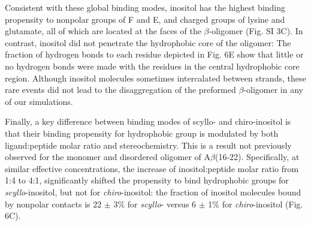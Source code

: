 Consistent with these global binding modes, inositol has the highest binding propensity to nonpolar groups of F and E, and charged groups of lysine and glutamate, all of which are located at the faces of the $\beta$-oligomer (Fig. SI 3C).  In contrast, inositol did not penetrate the hydrophobic core of the oligomer: The fraction of hydrogen bonds to each residue depicted in Fig. 6E show that little or no hydrogen bonds were made with the residues in the central hydrophobic core region. Although inositol molecules sometimes intercalated between strands, these rare events did not lead to the disaggregation of the preformed $\beta$-oligomer in any of our simulations.

Finally, a key difference between binding modes of scyllo- and chiro-inositol is that their binding propensity for hydrophobic group is modulated by both ligand:peptide molar ratio and stereochemistry. This is a result not previously observed for the monomer and disordered oligomer of A$\beta$(16-22). Specifically, at similar effective concentrations, the increase of inositol:peptide molar ratio from 1:4 to 4:1, significantly shifted the propensity to bind hydrophobic groups for \emph{scyllo}-inositol, but not for \emph{chiro}-inositol: the fraction of inositol molecules bound by nonpolar contacts is 22 $\pm$ 3\% for \emph{scyllo}- versus 6 $\pm$ 1\% for \emph{chiro}-inositol (Fig. 6C).

